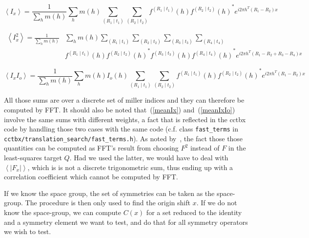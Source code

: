\documentclass[11pt]{article}
\newcommand{\mean}[1]{\left\langle #1 \right\rangle}
\newcommand{\sym}[2]{\left( #1 \mid #2 \right)}
\newcommand{\code}[1]{\texttt{#1}}
\begin{document}
\begin{equation}
\mean{I_x} = \frac{1}{\sum_h m(h)}\sum_h m(h) \sum_{\sym{R_1}{t_1}} \sum_{\sym{R_2}{t_2}} f^{\sym{R_1}{t_1}}(h) {f^{\sym{R_2}{t_2}}(h)}^* e^{i2\pi h^T (R_1 - R_2)x} 
\label{meanIx}
\end{equation}

\begin{equation}
\begin{split}
\mean{I_x^2} = \frac{1}{\sum_h m(h)}&\sum_h m(h) \sum_{\sym{R_1}{t_1}} \sum_{\sym{R_2}{t_2}} \sum_{\sym{R_3}{t_3}} \sum_{\sym{R_4}{t_4}} \\
&f^{\sym{R_1}{t_1}}(h) {f^{\sym{R_2}{t_2}}(h)}^* f^{\sym{R_3}{t_3}}(h) {f^{\sym{R_4}{t_4}}(h)}^* e^{i2\pi h^T (R_1 - R_2 + R_3 - R_4)x}
\end{split}
\label{meanIxsq}
\end{equation}

\begin{equation}
\mean{I_x I_o} = \frac{1}{\sum_h m(h)}\sum_h m(h)  I_o(h) \sum_{\sym{R_1}{t_1}} \sum_{\sym{R_2}{t_2}} f^{\sym{R_1}{t_1}}(h) {f^{\sym{R_2}{t_2}}(h)}^* e^{i2\pi h^T (R_1 - R_2)x}
\label{meanIxIo}
\end{equation}

All those sums are over a discrete set of miller indices and they can therefore be computed by FFT. It should also be noted that~(\ref{meanIx}) and~(\ref{meanIxIo}) involve the same sums with different weights, a fact that is reflected in the cctbx code by handling those two cases with the same code (c.f. class \code{fast\_terms} in \code{cctbx/translation\_search/fast\_terms.h}). As noted by~\cite{J.Navaza:1995}, the fact those those quantities can be computed as FFT's result from choosing $F^2$ instead of $F$ in the least-squares target $Q$. Had we used the latter, we would have to deal with $\mean{|F_x|}$, which is is not a discrete trigonometric sum, thus ending up with a correlation coefficient which cannot be computed by FFT.

If we know the space group, the set of symmetries can be taken as the space-group. The procedure is then only used to find the origin shift $x$. If we do not know the space-group, we can compute $C(x)$ for a set reduced to the identity and a symmetry element we want to test, and do that for all symmetry operators we wish to test.


\end{document}
